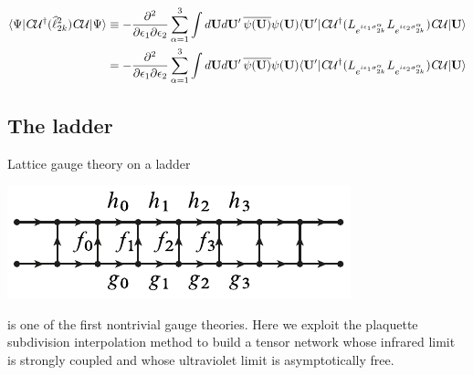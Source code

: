 \documentclass[12pt]{amsart}
\theoremstyle{definition}
\theoremstyle{remark}
\numberwithin{equation}{section}
\begin{document}
\begin{equation}
	\begin{split}
		\langle \Psi|\textsl{C}\mathcal{U}^\dag (\widehat{\ell}^2_{2k})\textsl{C}\mathcal{U}|\Psi\rangle &\equiv -\frac{\partial^2}{\partial\epsilon_1\partial \epsilon_2}\sum_{\alpha = 1}^3\int d\mathbf{U}d\mathbf{U}'\, \overline{\psi(\mathbf{U})}\psi(\mathbf{U})  \langle \mathbf{U}'|\textsl{C}\mathcal{U}^\dag (L_{e^{i\epsilon_1 \sigma^{\alpha}_{2k}}}L_{e^{i\epsilon_2 \sigma_{2k}^{\alpha}}})\textsl{C}\mathcal{U}|\mathbf{U}\rangle \\
		&=-\frac{\partial^2}{\partial\epsilon_1\partial \epsilon_2}\sum_{\alpha = 1}^3\int d\mathbf{U}d\mathbf{U}'\, \overline{\psi(\mathbf{U})}\psi(\mathbf{U})  \langle \mathbf{U}'|\textsl{C}\mathcal{U}^\dag (L_{e^{i\epsilon_1 \sigma^{\alpha}_{2k}}}L_{e^{i\epsilon_2 \sigma_{2k}^{\alpha}}})\textsl{C}\mathcal{U}|\mathbf{U}\rangle 
	\end{split}
\end{equation}




\subsection{The ladder}
Lattice gauge theory on a ladder
\begin{center}
	\includegraphics{ymladder.pdf}
\end{center}
is one of the first nontrivial gauge theories. Here we exploit the plaquette subdivision interpolation method to build a tensor network whose infrared limit is strongly coupled and whose ultraviolet limit is asymptotically free.
\end{document}
